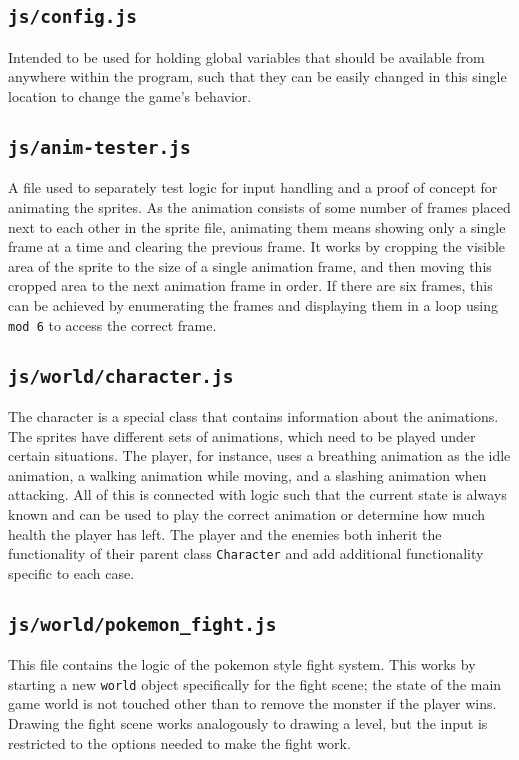 \documentclass[11pt]{article}
\begin{document}
\subsection{\texttt{js/config.js}}
\label{sec:orgdc6f78b}
Intended to be used for holding global variables that should be available from anywhere within the program, such that they can be easily changed in this single location to change the game's behavior.\\
\subsection{\texttt{js/anim-tester.js}}
\label{sec:orgcd80969}
A file used to separately test logic for input handling and a proof of concept for animating the sprites. As the animation consists of some number of frames placed next to each other in the sprite file, animating them means showing only a single frame at a time and clearing the previous frame. It works by cropping the visible area of the sprite to the size of a single animation frame, and then moving this cropped area to the next animation frame in order. If there are six frames, this can be achieved by enumerating the frames and displaying them in a loop using \texttt{mod 6} to access the correct frame.\\
\subsection{\texttt{js/world/character.js}}
\label{sec:orgc28d628}
The character is a special class that contains information about the animations. The sprites have different sets of animations, which need to be played under certain situations. The player, for instance, uses a breathing animation as the idle animation, a walking animation while moving, and a slashing animation when attacking. All of this is connected with logic such that the current state is always known and can be used to play the correct animation or determine how much health the player has left. The player and the enemies both inherit the functionality of their parent class \texttt{Character} and add additional functionality specific to each case.\\
\subsection{\texttt{js/world/pokemon\_fight.js}}
\label{sec:org081555f}
This file contains the logic of the pokemon style fight system. This works by starting a new \texttt{world} object specifically for the fight scene; the state of the main game world is not touched other than to remove the monster if the player wins. Drawing the fight scene works analogously to drawing a level, but the input is restricted to the options needed to make the fight work.\\
\end{document}
